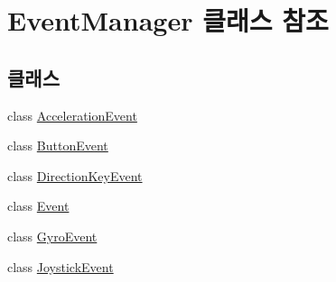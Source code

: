 \hypertarget{class_event_manager}{}\section{Event\+Manager 클래스 참조}
\label{class_event_manager}
\subsection*{클래스}
\begin{DoxyCompactItemize}
\item 
class \hyperlink{class_event_manager_1_1_acceleration_event}{Acceleration\+Event}
\item 
class \hyperlink{class_event_manager_1_1_button_event}{Button\+Event}
\item 
class \hyperlink{class_event_manager_1_1_direction_key_event}{Direction\+Key\+Event}
\item 
class \hyperlink{class_event_manager_1_1_event}{Event}
\item 
class \hyperlink{class_event_manager_1_1_gyro_event}{Gyro\+Event}
\item 
class \hyperlink{class_event_manager_1_1_joystick_event}{Joystick\+Event}
\end{DoxyCompactItemize}
